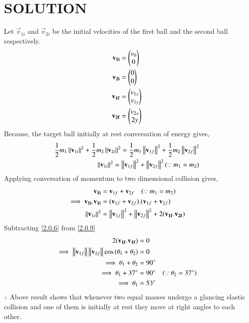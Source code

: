 \documentclass[journal,12pt,twocolumn]{IEEEtran}
\begin{document}
\section{SOLUTION}
Let $\vec{v}_{1i}$ and $\vec{v}_{2i}$ be the initial velocities of the first ball and the second ball respectively.
\begin{align}
 \mathbf{{v}_{1i}} &= \begin{pmatrix}v_{0}\\0\end{pmatrix} \\
 \mathbf{{v}_{2i}} &= \begin{pmatrix}0\\0\end{pmatrix} \\
 \mathbf{{v}_{1f}} &= \begin{pmatrix}v_{1x}\\v_{1y}\end{pmatrix}\\
 \mathbf{{v}_{2f}} &= \begin{pmatrix}v_{2x}\\2y\end{pmatrix} 
\end{align}
Because, the target ball initially at rest conversation of energy gives,
\begin{align}
\frac{1}{2}m_1\left\lVert\mathbf{v}_{1i}\right\rVert^2+\frac{1}{2}m_2\left\lVert\mathbf{v}_{2i}\right\rVert^2=\frac{1}{2}m_1\left\lVert\mathbf{v}_{1f}\right\rVert^2+\frac{1}{2}m_2\left\lVert\mathbf{v}_{2f}\right\rVert^2\\
\left\lVert\mathbf{v}_{1i}\right\rVert^2=\left\lVert\mathbf{v}_{1f}\right\rVert^2+\left\lVert\mathbf{v}_{2f}\right\rVert^2
(\because m_1=m_2)\label{2.0.6}
\end{align}
Applying conversation of momentum to two dimensional collision gives,
\begin{align}
\mathbf{{v}_{1i}}&=\mathbf{v}_{1f}+\mathbf{v}_{2f}\quad(\because m_1=m_2)\\
\implies\mathbf{{v}_{1i}}.\mathbf{{v}_{1i}}&=(\mathbf{v}_{1f}+\mathbf{v}_{2f}).(\mathbf{v}_{1f}+\mathbf{v}_{2f})\\
\left\lVert\mathbf{v}_{1i}\right\rVert^2&=\left\lVert\mathbf{v}_{1f}\right\rVert^2+\left\lVert\mathbf{v}_{2f}\right\rVert^2+2(\mathbf{v_{1f}}.\mathbf{v_{2f}})\label{2.0.9}
\end{align}
Subtracting \eqref{2.0.6} from \eqref{2.0.9}
\begin{align}
2(\mathbf{v_{1f}}.\mathbf{v_{1f}})&=0\\
\implies\left\lVert\mathbf{v}_{1f}\right\rVert\left\lVert\mathbf{v}_{2f}\right\rVert\cos{(\theta_1+\theta_2)}&=0\\
\implies \theta_1+\theta_2 &=90\degree\\
\implies \theta_1+37\degree &=90\degree \quad(\because \theta_2= 37\degree)\\
\implies \theta_1&=53\degree
\end{align}
$\therefore$ Above result shows that whenever two equal masses undergo a glancing elastic collision and one of them is initially at rest they move at right angles to each other.
\end{document}
